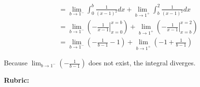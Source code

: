 \documentclass[12pt,addpoints,answers]{exam}
\begin{document}
\begin{questions}
\begin{solution}
\begin{parts}
\[\begin{aligned}
& =\lim _{b \rightarrow 1^{-}} \int_{0}^{b} \frac{1}{(x-1)^{2}} d x+\lim _{b \rightarrow 1^{+}} \int_{b}^{2} \frac{1}{(x-1)^{2}} d x \\
& =\lim _{b \rightarrow 1^{-}}\left(-\left.\frac{1}{x-1}\right|_{x=0} ^{x=b}\right)+\lim _{b \rightarrow 1^{+}}\left(-\left.\frac{1}{x-1}\right|_{x=b} ^{x=2}\right) \\
& =\lim _{b \rightarrow 1^{-}}\left(-\frac{1}{b-1}-1\right)+\lim _{b \rightarrow 1^{+}}\left(-1+\frac{1}{b-1}\right)
\end{aligned}\]

Because $\lim _{b \rightarrow 1^{-}}\left(-\frac{1}{b-1}\right)$ does not exist, the integral diverges.
\end{parts}
\par\medskip
\textbf{Rubric:}\par
{}
\end{solution}


\end{questions}
\end{document}
